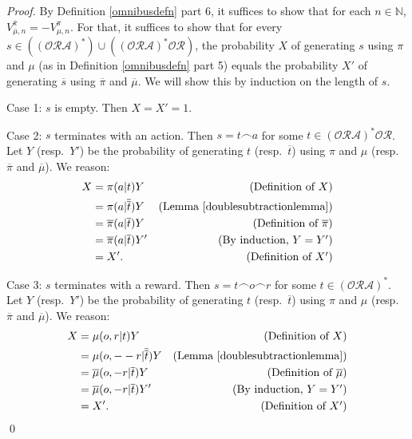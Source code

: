 \documentclass[runningheads]{llncs}
\begin{document}
\begin{proof}
    By Definition \ref{omnibusdefn} part 6,
    it suffices to show that for each $n\in\mathbb N$,
    $V^{\overline \pi}_{\overline \mu,n}=-V^\pi_{\mu,n}$.
    For that, it suffices to show that for every
    $s\in ((\mathcal O\mathcal R\mathcal A)^*)
    \cup ((\mathcal O\mathcal R\mathcal A)^*\mathcal O\mathcal R)$,
    the probability $X$ of generating $s$ using $\pi$ and $\mu$
    (as in Definition \ref{omnibusdefn} part 5)
    equals the probability $X'$ of generating $\overline s$
    using $\overline \pi$ and $\overline \mu$.
    We will show this by induction on the length of $s$.

    Case 1: $s$ is empty. Then $X=X'=1$.

    Case 2: $s$ terminates with an action.
    Then $s=t\frown a$ for some $t\in(\mathcal O\mathcal R\mathcal A)^*\mathcal O\mathcal R$.
    Let $Y$ (resp.\ $Y'$) be the probability of generating $t$
    (resp.\ $\overline t$)
    using $\pi$ and $\mu$ (resp.\ $\overline\pi$ and $\overline\mu$). We reason:
    \begin{align*}
        X &= \pi(a|t)Y
            &\mbox{(Definition of $X$)}\\
          &= \pi(a|\overline{\overline t})Y
            &\mbox{(Lemma \ref{doublesubtractionlemma})}\\
          &= \overline \pi(a|\overline t)Y
            &\mbox{(Definition of $\overline \pi$)}\\
          &= \overline \pi(a|\overline t)Y'
            &\mbox{(By induction, $Y=Y'$)}\\
          &= X'. &\mbox{(Definition of $X'$)}
    \end{align*}

    Case 3: $s$ terminates with a reward.
    Then $s=t\frown o \frown r$
    for some $t\in (\mathcal O\mathcal R\mathcal A)^*$.
    Let $Y$ (resp.\ $Y'$) be the probability of generating $t$
    (resp.\ $\overline t$)
    using $\pi$ and $\mu$ (resp.\ $\overline \pi$ and $\overline \mu$). We reason:
    \begin{align*}
        X &= \mu(o,r|t)Y
            &\mbox{(Definition of $X$)}\\
          &= \mu(o,--r| \overline{\overline t})Y
            &\mbox{(Lemma \ref{doublesubtractionlemma})}\\
          &= \overline \mu(o,-r| \overline t)Y
            &\mbox{(Definition of $\overline\mu$)}\\
          &= \overline \mu(o,-r| \overline t)Y'
            &\mbox{(By induction, $Y=Y'$)}\\
          &= X'. &\mbox{(Definition of $X'$)}
    \end{align*}
    \qed
\end{proof}
\end{document}
